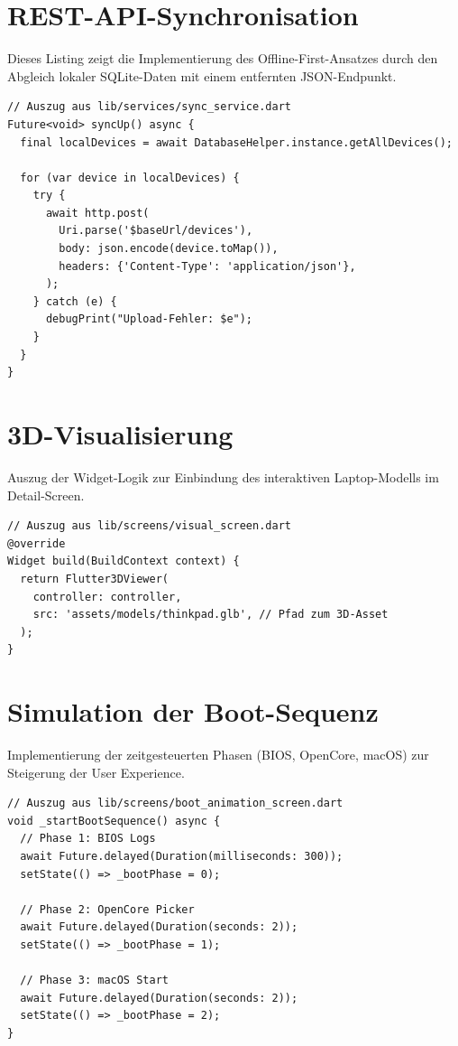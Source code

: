 \section{REST-API-Synchronisation}
Dieses Listing zeigt die Implementierung des Offline-First-Ansatzes durch den Abgleich lokaler SQLite-Daten mit einem entfernten JSON-Endpunkt.

\begin{lstlisting}[caption={SyncService.dart – REST-API-Anbindung}]
// Auszug aus lib/services/sync_service.dart
Future<void> syncUp() async {
  final localDevices = await DatabaseHelper.instance.getAllDevices();
  
  for (var device in localDevices) {
    try {
      await http.post(
        Uri.parse('$baseUrl/devices'),
        body: json.encode(device.toMap()),
        headers: {'Content-Type': 'application/json'},
      );
    } catch (e) {
      debugPrint("Upload-Fehler: $e");
    }
  }
}
\end{lstlisting}

\section{3D-Visualisierung}
Auszug der Widget-Logik zur Einbindung des interaktiven Laptop-Modells im Detail-Screen.

\begin{lstlisting}[caption={VisualScreen.dart – 3D-Modell-Einbindung}]
// Auszug aus lib/screens/visual_screen.dart
@override
Widget build(BuildContext context) {
  return Flutter3DViewer(
    controller: controller,
    src: 'assets/models/thinkpad.glb', // Pfad zum 3D-Asset
  );
}
\end{lstlisting}

\section{Simulation der Boot-Sequenz}
Implementierung der zeitgesteuerten Phasen (BIOS, OpenCore, macOS) zur Steigerung der User Experience.

\begin{lstlisting}[caption={BootAnimationScreen.dart – Phasensteuerung}]
// Auszug aus lib/screens/boot_animation_screen.dart
void _startBootSequence() async {
  // Phase 1: BIOS Logs
  await Future.delayed(Duration(milliseconds: 300));
  setState(() => _bootPhase = 0);

  // Phase 2: OpenCore Picker
  await Future.delayed(Duration(seconds: 2));
  setState(() => _bootPhase = 1);

  // Phase 3: macOS Start
  await Future.delayed(Duration(seconds: 2));
  setState(() => _bootPhase = 2);
}
\end{lstlisting}